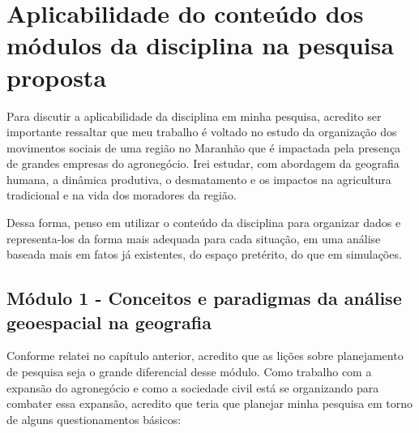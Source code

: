 \section{Aplicabilidade do conteúdo dos módulos da disciplina na pesquisa proposta}

Para discutir a aplicabilidade da disciplina em minha pesquisa, acredito ser importante ressaltar que meu trabalho é voltado no estudo da organização dos movimentos sociais de uma região no Maranhão que é impactada pela presença de grandes empresas do agronegócio. Irei estudar, com abordagem da geografia humana, a dinâmica produtiva, o desmatamento e os impactos na agricultura tradicional e na vida dos moradores da região. 

Dessa forma, penso em utilizar o conteúdo da disciplina para organizar dados e representa-los da forma mais adequada para cada situação, em uma análise baseada mais em fatos já existentes, do espaço pretérito, do que em simulações.

\subsection{Módulo 1 - Conceitos e paradigmas da análise geoespacial na geografia}

Conforme relatei no capítulo anterior, acredito que as lições sobre planejamento de pesquisa seja o grande diferencial desse módulo. Como trabalho com a expansão do agronegócio e como a sociedade civil está se organizando para combater essa expansão, acredito que teria que planejar minha pesquisa em torno de alguns questionamentos básicos:

